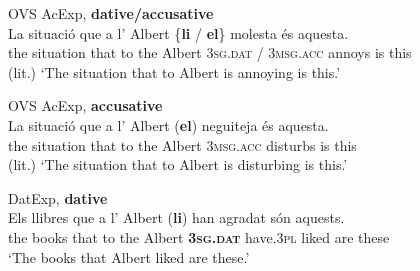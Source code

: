 \documentclass[output=paper,colorlinks,citecolor=brown,modfonts,nonflat]{langsci/langscibook}
\begin{document}
\ea%
 \label{ex:royo:10}
 \ea  OVS AcExp, \textbf{dative/accusative} \label{ex:royo:10a}\\
 \gll  La situació que a l’ Albert \{\textbf{li} / \textbf{el}\} molesta és aquesta.\\
	 the situation that to the Albert \textsc{3sg.dat} / \textsc{3msg.acc} annoys is this\\
 \glt (lit.) ‘The situation that to Albert is annoying is this.’

 \ex OVS AcExp, \textbf{accusative}\label{ex:royo:10b}\\
 \gll La  situació  que a  l’ Albert (\textbf{el}) neguiteja és aquesta.\\
  the situation that to the Albert \textsc{3msg.acc} disturbs is this\\
 \glt (lit.) ‘The situation that to Albert is disturbing is this.’

 \ex  DatExp, \textbf{dative} \label{ex:royo:10c}\\
 \gll Els llibres que a l’ Albert (\textbf{li}) han agradat són aquests.\\
  the books that to the Albert \textbf{\textsc{3sg.dat}} have.\textsc{3pl} liked are these\\
 \glt ‘The books that Albert liked are these.’
\end{document}

